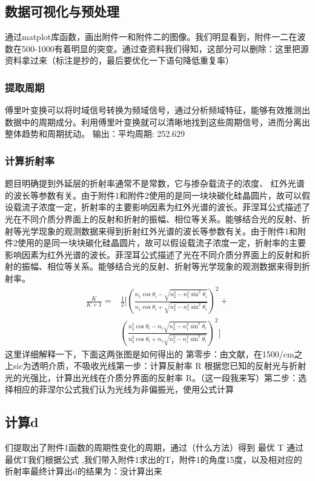 \documentclass{cumcmthesis}
\begin{document}
	\subsection{数据可视化与预处理}
	通过matplot库函数，画出附件一和附件二的图像。我们明显看到，附件一二在波数在500-1000有着明显的突变。通过查资料我们得知，这部分可以删除：这里把源资料拿过来（标注是抄的，最后要优化一下语句降低重复率）
	\subsubsection{提取周期}
	傅里叶变换可以将时域信号转换为频域信号，通过分析频域特征，能够有效推测出数据中的周期成分。利用傅里叶变换就可以清晰地找到这些周期信号，进而分离出整体趋势和周期扰动。
输出：平均周期: 252.629
	\subsubsection{计算折射率}
	题目明确提到外延层的折射率通常不是常数，它与掺杂载流子的浓度、
红外光谱的波长等参数有关。由于附件1和附件2使用的是同一块块碳化硅晶圆片，故可以假设载流子浓度一定，折射率的主要影响因素为红外光谱的波长。菲涅耳公式描述了光在不同介质分界面上的反射和折射的振幅、相位等关系。能够结合光的反射、折射等光学现象的观测数据来得到折射红外光谱的波长等参数有关。由于附件1和附件2使用的是同一块块碳化硅晶圆片，故可以假设载流子浓度一定，折射率的主要影响因素为红外光谱的波长。菲涅耳公式描述了光在不同介质分界面上的反射和折射的振幅、相位等关系。能够结合光的反射、折射等光学现象的观测数据来得到折射率。
	\begin{equation}
	\begin{split}
	\frac{K}{K + 1} = &\frac{1}{2}\bigg[ \left( \frac{n_1 \cos\theta_i - \sqrt{n_2^2 - n_1^2 \sin^2\theta_i}}{n_1 \cos\theta_i + \sqrt{n_2^2 - n_1^2 \sin^2\theta_i}} \right)^2 + \\
	&\left( \frac{n_2^2 \cos\theta_i - n_1 \sqrt{n_2^2 - n_1^2 \sin^2\theta_i}}{n_2^2 \cos\theta_i + n_1 \sqrt{n_2^2 - n_1^2 \sin^2\theta_i}} \right)^2 \bigg]
	\end{split}
	\end{equation}
这里详细解释一下，下面这两张图是如何得出的
第零步：由文献，在1500/cm之上sic为透明介质，不吸收光线第一步：计算反射率 R 根据您已知的反射光与折射光的光强比，计算出光线在介质分界面的反射率 R。（这一段我来写）第二步：选择相应的菲涅尔公式我们认为光线为非偏振光，使用公式计算
\subsection{计算d}
们提取出了附件1函数的周期性变化的周期，通过（什么方法）得到
最优 T
通过最优T我们根据公式 ,我们带入附件1求出的T，附件1的角度15度，以及相对应的折射率最终计算出d的结果为：没计算出来
\end{document}
